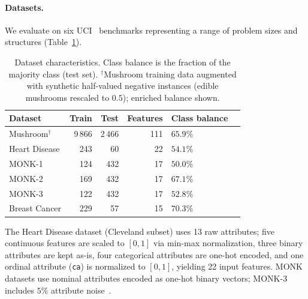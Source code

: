 \documentclass[lettersize,journal]{IEEEtran}
\begin{document}
\paragraph{Datasets.}
We evaluate on six UCI~\cite{uci2017} benchmarks representing a range of
problem sizes and structures (Table~\ref{tab:datasets}).

\begin{table}[h]
\centering
\caption{Dataset characteristics. Class balance is the fraction of the majority class
(test set). $^{\dagger}$Mushroom training data augmented with synthetic half-valued
negative instances (edible mushrooms rescaled to $0.5$); enriched balance shown.}
\label{tab:datasets}
\setlength{\tabcolsep}{5pt}
\begin{tabular}{lrrrll}
\toprule
Dataset & Train & Test & Features & Class balance  \\
\midrule
Mushroom$^{\dagger}$ & 9\,866 & 2\,466 & 111 & $65.9\%$ \\
Heart Disease        & 243    & 60     & 22  & $54.1\%$ \\
MONK-1               & 124    & 432    & 17  & $50.0\%$ \\
MONK-2               & 169    & 432    & 17  & $67.1\%$ \\
MONK-3               & 122    & 432    & 17  & $52.8\%$ \\
Breast Cancer        & 229    & 57     & 15  & $70.3\%$ \\
\bottomrule
\end{tabular}
\end{table}

The Heart Disease dataset (Cleveland subset) uses 13 raw attributes;
five continuous features are scaled to $[0,1]$ via min-max normalization,
three binary attributes are kept as-is, four categorical attributes are
one-hot encoded, and one ordinal attribute (\texttt{ca}) is normalized to
$[0,1]$, yielding 22 input features.
MONK datasets use nominal attributes encoded as one-hot binary vectors;
MONK-3 includes $5\%$ attribute noise~\cite{thrun1991}.
\end{document}
